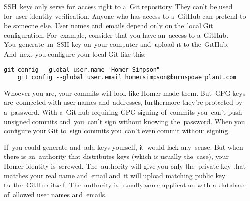 \label{gitgpg}
SSH~keys only serve for~access right to a~\hyperref[git]{Git} repository. They can't be used for~user identity verification. Anyone who has access to a~GitHub can pretend to be someone else. User names and~emails depend only on the~local Git configuration. For~example, consider that you have an~access to a~GitHub. You~generate an~SSH key on~your computer and~upload it to the~GitHub. And~next you configure your local Git like this:
\begin{lstlisting}[frame=no]
    git config --global user.name "Homer Simpson"
    git config --global user.email homersimpson@burnspowerplant.com
\end{lstlisting}
\noindent Whoever you are, your commits will look like Homer made them. But~GPG keys are~connected with user names and~addresses, furthermore they're protected by a~password. With a~Git hub requiring GPG signing of~commits you~can't push unsigned commits and~you~can't sign without knowing the~password. When you configure your Git to~sign commits you~can't even commit without signing.

If~you could generate and~add keys yourself, it~would lack any~sense. But when there is an~authority that distributes keys (which is usually the~case), your Homer identity is~screwed. The~authority will give you only the~private key that matches your real name and~email and~it will upload matching public key to~the~GitHub itself. The~authority is~usually some application with a~database of~allowed user names and~emails.